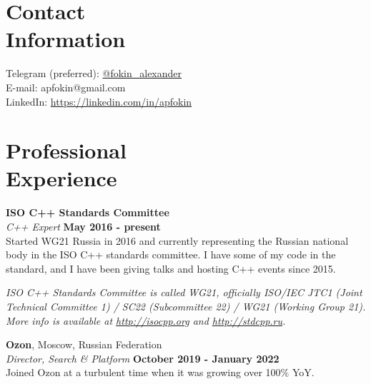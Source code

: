 \documentclass[margin,line]{CV}
\begin{document}
\begin{resume}


    \section{\mysidestyle Contact\\Information}
    Telegram (preferred): \href{https://t.me/fokin_alexander}{@fokin\_alexander} \\
    E-mail: apfokin@gmail.com \\
    LinkedIn: \url{https://linkedin.com/in/apfokin} \\

    \section{\mysidestyle Professional\\Experience}
    \textbf{ISO C++ Standards Committee}\vspace{1mm}\\
    \textsl{C++ Expert} \hfill \textbf{May 2016 - present}\vspace{1mm}\\
    Started WG21 Russia in 2016 and currently representing the Russian national body in the ISO C++ standards committee. I have some of my code in the standard, and I have been giving talks and hosting C++ events since 2015.

\ifdefined\superofficial
    {\footnotesize\textit{ISO C++ Standards Committee is called WG21, officially ISO/IEC JTC1 (Joint Technical Committee 1) / SC22 (Subcommittee 22) / WG21 (Working Group 21). More info is available at \url{http://isocpp.org} and \url{http://stdcpp.ru}.}}
\fi


    \vspace{2mm}
    \textbf{Ozon}, Moscow, Russian Federation\vspace{1mm}\\
    \textsl{Director, Search \& Platform} \hfill \textbf{October 2019 - January 2022}\vspace{1mm}\\
    Joined Ozon at a turbulent time when it was growing over 100\% YoY. 


\end{resume}
\end{document}
